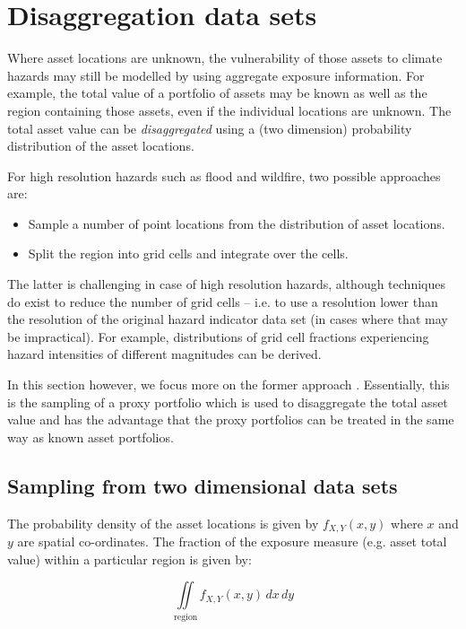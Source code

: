 \documentclass[a4paper,11pt]{extarticle} %
\theoremstyle{definition}
\begin{document}
\section{Disaggregation data sets}

Where asset locations are unknown, the vulnerability of those assets to climate hazards may still be modelled by using aggregate exposure information. For example, the total value of a portfolio of assets may be known as well as the region containing those assets, even if the individual locations are unknown. The total asset value can be \emph{disaggregated} using  a (two dimension) probability distribution of the asset locations. 

For high resolution hazards such as flood and wildfire, two possible approaches are:
\begin{itemize}
\item Sample a number of point locations from the distribution of asset locations. 
\item Split the region into grid cells and integrate over the cells.
\end{itemize}

The latter is challenging in case of high resolution hazards, although techniques do exist to reduce the number of grid cells -- i.e. to use a resolution lower than the resolution of the original hazard indicator data set (in cases where that may be impractical). For example, distributions of grid cell fractions experiencing hazard intensities of different magnitudes can be derived. 

In this section however, we focus more on the former approach . Essentially, this is the sampling of a proxy portfolio which is used to disaggregate the total asset value and has the advantage that the proxy portfolios can be treated in the same way as known asset portfolios.


\subsection{Sampling from two dimensional data sets}
The probability density of the asset locations is given by $f_{X, Y}(x, y)$ where $x$ and $y$ are spatial co-ordinates. The fraction of the exposure measure (e.g. asset total value) within a particular region is given by: 

\begin{equation}
	\label{Eq:Disagg1}
	\iint\limits_{\mathrm{region}} f_{X, Y}(x, y) \, dx \, dy
\end{equation}
\end{document}

